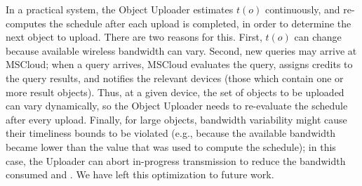 %
In a practical system, the Object Uploader estimates $t(o)$
continuously, and re-computes the schedule after each upload is
completed, in order to determine the next object to upload.
%
There are two reasons for this.
%
First, $t(o)$ can change because available wireless bandwidth can
vary.
%
Second, new queries may arrive at MSCloud; when a query arrives,
MSCloud evaluates the query, assigns credits to the query results, and
notifies the relevant devices (those which contain one or more result
objects).
%
Thus, at a given device, the set of objects to be uploaded can vary
dynamically, so the Object Uploader needs to re-evaluate the schedule
after every upload.
%
Finally, for large objects, bandwidth variability might cause their
timeliness bounds to be violated (e.g., because the available
bandwidth became lower than the value that was used to compute the
schedule); in this case, the Uploader can abort in-progress
transmission to reduce the bandwidth consumed and .
%
We have left this optimization to future work.
%

%
%


